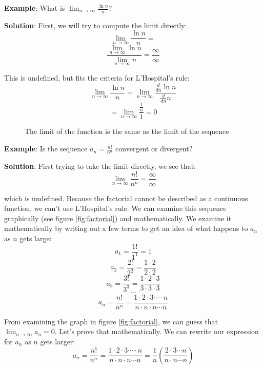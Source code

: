 \textbf{Example}: What is $\lim_{n \to \infty} \frac{\ln{n}}{n}$? 

\textbf{Solution}: First, we will try to compute the limit directly:
$$\lim_{n \to \infty} \frac{\ln{n}}{n} = $$
$$\frac{\lim_{n \to \infty} \ln{n}}{\lim_{n \to \infty}n} = 
\frac{\infty}{\infty}$$

This is undefined, but fits the criteria for L'Hospital's rule:
$$\lim_{n \to \infty} \frac{\ln{n}}{n} = \lim_{n \to \infty} 
\frac{\frac{d}{dn}\ln{n}}{\frac{d}{dn}n}$$
$$= \lim_{n \to \infty} \frac{\frac{1}{n}}{1} = 0$$

\begin{figure}[htbp]
\centering
    \caption{The limit of the function is the same as the limit of the sequence}
    \label{fig:limit}
\end{figure}

\textbf{Example}: Is the sequence $a_n = \frac{n!}{n^n}$ convergent or divergent? 

\textbf{Solution}: First trying to take the limit directly, we see that:
$$\lim_{n \to \infty} \frac{n!}{n^n} = \frac{\infty}{\infty}$$

which is undefined. Because the factorial cannot be described as a continuous 
function, we can't use L'Hospital's rule. We can examine this sequence 
graphically (see figure \ref{fig:factorial}) and mathematically. We examine it 
mathematically by writing out a few terms to get an idea of what happens to 
$a_n$ as $n$ gets large:
$$a_1 = \frac{1!}{1^1} = 1$$
$$a_2 = \frac{2!}{2^2} = \frac{1 \cdot 2}{2 \cdot 2}$$
$$a_3 = \frac{3!}{3^3} = \frac{1 \cdot 2 \cdot 3}{3 \cdot 3 \cdot 3}$$
$$\cdots$$
$$a_n = \frac{n!}{n^n} = \frac{1 \cdot 2 \cdot 3 \cdots \cdot n}{n 
\cdot n \cdot n \cdots n}$$

From examining the graph in figure \ref{fig:factorial}, we can guess that 
$\lim_{n \to \infty} a_n = 0$. Let's prove that mathematically. We can rewrite 
our expression for $a_n$ as $n$ gets larger:
$$a_n = \frac{n!}{n^n} = \frac{1 \cdot 2 \cdot 3 \cdots \cdot n}{n 
\cdot n \cdot n \cdots n} = \frac{1}{n}(\frac{2 \cdot 3 \cdots n}{n 
\cdot n \cdots n})$$

